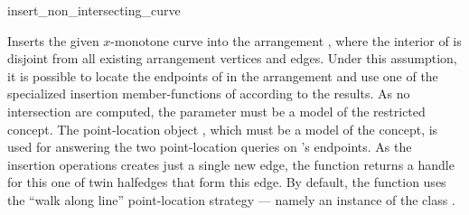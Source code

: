 
\ccRefPageBegin

\begin{ccRefFunction}{insert_non_intersecting_curve}


   {Inserts the given $x$-monotone curve  into the arrangement
    , where the interior of  is disjoint from all existing
    arrangement vertices and edges. Under this assumption, it is possible to
    locate the endpoints of  in the arrangement and use one of the
    specialized insertion member-functions of  according to the
    results. As no intersection are computed, the  parameter
    must be a model of the restricted  concept.
    The point-location object , which must be a model of the
     concept, is used for answering
    the two point-location queries on 's endpoints. As the insertion
    operations creates just a single new edge, the function returns a handle
    for this one of twin halfedges that form this edge.
    By default, the function uses the ``walk along line'' point-location
    strategy --- namely an instance of the class
    .
    }


\end{ccRefFunction}

\ccRefPageEnd
